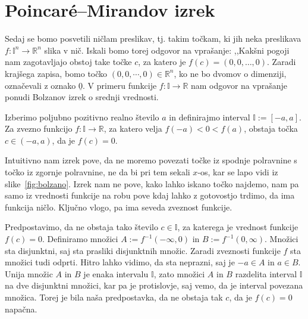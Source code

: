 \documentclass[mat1]{fmfdelo}
\newcommand{\R}{\mathbb R}
\newcommand{\I}{\mathbb I}
\newcommand{\0}{\underline{0}}
\begin{document}
\section{Poincar\'e--Mirandov izrek}\label{raz:PM}
Sedaj se bomo posvetili ničlam preslikav, tj. takim točkam, ki jih neka preslikava $f : \I^n \to \R^n$ slika v nič. Iskali bomo torej odgovor na vprašanje: ,,Kakšni pogoji nam zagotavljajo obstoj take točke $c$, za katero je $f(c) = (0, 0, \dots, 0)$. Zaradi krajšega zapisa, bomo točko $(0, 0, \cdots, 0) \in \R^n$, ko ne bo dvomov o dimenziji, označevali z oznako $\0$. V primeru funkcije $f : \I \to \R$ nam odgovor na vprašanje ponudi Bolzanov izrek o srednji vrednosti.
\begin{izrek}\label{izr:bolzano}
Izberimo poljubno pozitivno realno število $a$ in definirajmo interval $\I := [-a, a]$. Za zvezno funkcijo $f : \I \to \R$, za katero velja $f(-a) < 0 < f(a)$, obstaja točka $c \in (-a, a)$, da je $f(c) = 0$.
\end{izrek}
Intuitivno nam izrek pove, da ne moremo povezati točke iz spodnje polravnine s točko iz zgornje polravnine, ne da bi pri tem sekali $x$-os, kar se lapo vidi iz slike~\ref{fig:bolzano}. Izrek nam ne pove, kako lahko iskano točko najdemo, nam pa samo iz vrednosti funkcije na robu pove kdaj lahko z gotovostjo trdimo, da ima funkcija ničlo. Ključno vlogo, pa ima seveda zveznost funkcije.
\begin{dokaz}
Predpostavimo, da ne obstaja tako število $c \in \I$, za katerega je vrednost funkcije $f(c) = 0$. Definiramo množici $A := f^{-1}(- \infty, 0)$ in $B := f^{-1}(0, \infty)$. Množici sta disjunktni, saj sta prasliki disjunktnih množic. Zaradi zveznosti funkcije $f$ sta množici tudi odprti. Hitro lahko vidimo, da sta neprazni, saj je $-a \in A$ in $a \in B$. Unija množic $A$ in $B$ je enaka intervalu $\I$, zato množici $A$ in $B$ razdelita interval $\I$ na dve disjunktni množici, kar pa je protislovje, saj vemo, da je interval povezana množica. Torej je bila naša predpostavka, da ne obstaja tak $c$, da je $f(c) = 0$ napačna.
\end{dokaz}
\end{document}
